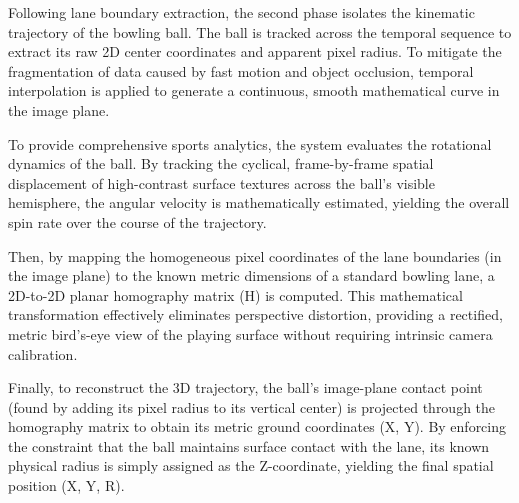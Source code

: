 Following lane boundary extraction, the second phase isolates the kinematic trajectory of the bowling ball. The ball is tracked across the temporal sequence to extract its raw 2D center coordinates and apparent pixel radius. To mitigate the fragmentation of data caused by fast motion and object occlusion, temporal interpolation is applied to generate a continuous, smooth mathematical curve in the image plane.

To provide comprehensive sports analytics, the system evaluates the rotational dynamics of the ball. By tracking the cyclical, frame-by-frame spatial displacement of high-contrast surface textures across the ball's visible hemisphere, the angular velocity is mathematically estimated, yielding the overall spin rate over the course of the trajectory.

Then, by mapping the homogeneous pixel coordinates of the lane boundaries (in the image plane) to the known metric dimensions of a standard bowling lane, a 2D-to-2D planar homography matrix (H) is computed. This mathematical transformation effectively eliminates perspective distortion, providing a rectified, metric bird's-eye view of the playing surface without requiring intrinsic camera calibration.


Finally, to reconstruct the 3D trajectory, the ball's image-plane contact point (found by adding its pixel radius to its vertical center) is projected through the homography matrix to obtain its metric ground coordinates (X, Y). By enforcing the constraint that the ball maintains surface contact with the lane, its known physical radius is simply assigned as the Z-coordinate, yielding the final spatial position (X, Y, R). 
